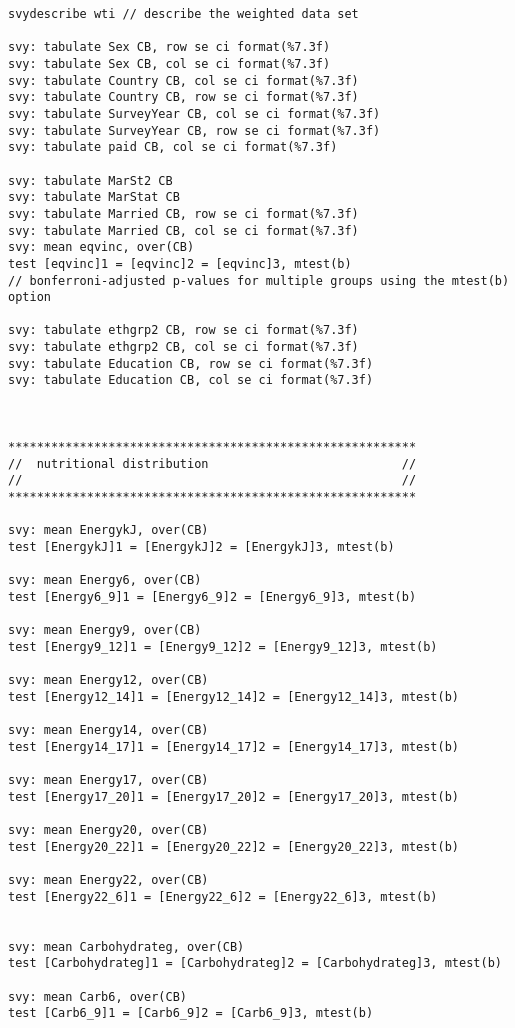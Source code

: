 \begin{verbatim}
svydescribe wti // describe the weighted data set

svy: tabulate Sex CB, row se ci format(%7.3f)
svy: tabulate Sex CB, col se ci format(%7.3f)
svy: tabulate Country CB, col se ci format(%7.3f)
svy: tabulate Country CB, row se ci format(%7.3f)
svy: tabulate SurveyYear CB, col se ci format(%7.3f)
svy: tabulate SurveyYear CB, row se ci format(%7.3f)
svy: tabulate paid CB, col se ci format(%7.3f)

svy: tabulate MarSt2 CB
svy: tabulate MarStat CB
svy: tabulate Married CB, row se ci format(%7.3f)
svy: tabulate Married CB, col se ci format(%7.3f)
svy: mean eqvinc, over(CB)
test [eqvinc]1 = [eqvinc]2 = [eqvinc]3, mtest(b) 
// bonferroni-adjusted p-values for multiple groups using the mtest(b) option

svy: tabulate ethgrp2 CB, row se ci format(%7.3f)
svy: tabulate ethgrp2 CB, col se ci format(%7.3f)
svy: tabulate Education CB, row se ci format(%7.3f)
svy: tabulate Education CB, col se ci format(%7.3f)



*********************************************************
//  nutritional distribution                           //
//                                                     //
*********************************************************

svy: mean EnergykJ, over(CB)
test [EnergykJ]1 = [EnergykJ]2 = [EnergykJ]3, mtest(b) 

svy: mean Energy6, over(CB)
test [Energy6_9]1 = [Energy6_9]2 = [Energy6_9]3, mtest(b) 

svy: mean Energy9, over(CB) 
test [Energy9_12]1 = [Energy9_12]2 = [Energy9_12]3, mtest(b) 

svy: mean Energy12, over(CB)
test [Energy12_14]1 = [Energy12_14]2 = [Energy12_14]3, mtest(b) 

svy: mean Energy14, over(CB)
test [Energy14_17]1 = [Energy14_17]2 = [Energy14_17]3, mtest(b) 

svy: mean Energy17, over(CB)
test [Energy17_20]1 = [Energy17_20]2 = [Energy17_20]3, mtest(b) 

svy: mean Energy20, over(CB)
test [Energy20_22]1 = [Energy20_22]2 = [Energy20_22]3, mtest(b) 

svy: mean Energy22, over(CB)
test [Energy22_6]1 = [Energy22_6]2 = [Energy22_6]3, mtest(b) 


svy: mean Carbohydrateg, over(CB)
test [Carbohydrateg]1 = [Carbohydrateg]2 = [Carbohydrateg]3, mtest(b) 

svy: mean Carb6, over(CB)
test [Carb6_9]1 = [Carb6_9]2 = [Carb6_9]3, mtest(b) 


\end{verbatim}
